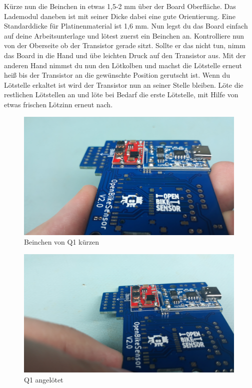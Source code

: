 \documentclass[12pt, a4paper]{article}		%
\begin{document}
Kürze nun die Beinchen in etwas 1,5-2 mm über der Board Oberfläche. Das Lademodul daneben ist mit seiner Dicke dabei eine gute Orientierung. Eine Standarddicke für Platinenmaterial ist 1,6 mm. Nun legst du das Board einfach auf deine Arbeitsunterlage und lötest zuerst ein Beinchen an. Kontrolliere nun von der Oberseite ob der Transistor gerade sitzt. Sollte er das nicht tun, nimm das Board in die Hand und übe leichten Druck auf den Transistor aus. Mit der anderen Hand nimmst du nun den Lötkolben und machst die Lötstelle erneut heiß bis der Transistor an die gewünschte Position gerutscht ist. Wenn du Lötstelle erkaltet ist wird der Transistor nun an seiner Stelle bleiben. Löte die restlichen Lötstellen an und löte bei Bedarf die erste Lötstelle, mit Hilfe von etwas frischen Lötzinn erneut nach.
\begin{minipage}[t]{0.49\textwidth}
\begin{figure}[H]
	\centering
		\includegraphics[width=0.99\textwidth]{Grafiken/20200726_124729.jpg}
	\caption{Beinchen von Q1 kürzen}
	\label{fig:}
\end{figure}
\end{minipage}
\begin{minipage}[t]{0.49\textwidth}
\begin{figure}[H]
	\centering
		\includegraphics[width=0.99\textwidth]{Grafiken/20200726_124826.jpg}
	\caption{Q1 angelötet}
	\label{fig:}
\end{figure}
\end{minipage}
\end{document}

